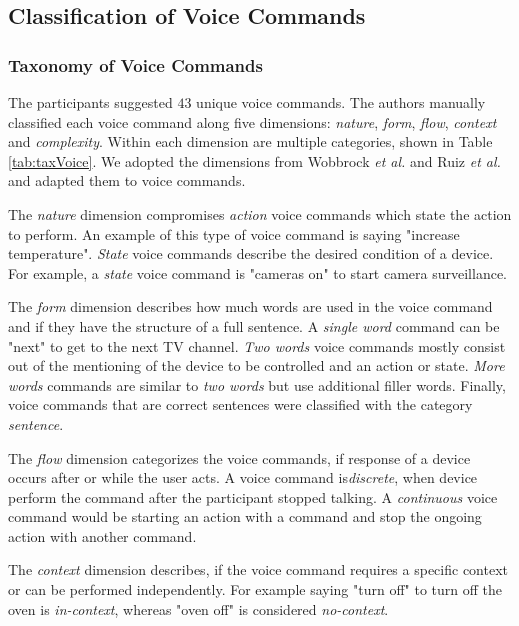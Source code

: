 \documentclass[sigchi]{acmart}
\begin{document}
\subsection{Classification of Voice Commands}
\subsubsection{Taxonomy of Voice Commands}
The participants suggested $43$ unique voice commands. The authors manually classified each voice command along five dimensions: \textit{nature}, \textit{form}, \textit{flow}, \textit{context} and \textit{complexity}. Within each dimension are multiple categories, shown in Table \ref{tab:taxVoice}. We adopted the dimensions from Wobbrock \textit{et al.} \citep{Wobbrock.2009} and Ruiz \textit{et al.} \citep{Ruiz.2011} and adapted them to voice commands. 

The \textit{nature} dimension compromises \textit{action} voice commands which state the action to perform. An example of this type of voice command is saying "increase temperature". \textit{State} voice commands describe the desired condition of a device. For example, a \textit{state} voice command is "cameras on" to start camera surveillance.

The \textit{form} dimension describes how much words are used in the voice command and if they have the structure of a full sentence. A \textit{single word} command can be "next" to get to the next TV channel. \textit{Two words} voice commands mostly consist out of the mentioning of the device to be controlled and an action or state. \textit{More words} commands are similar to \textit{two words} but use additional filler words. Finally, voice commands that are correct sentences were classified with the category \textit{sentence}.

The \textit{flow} dimension categorizes the voice commands, if response of a device occurs after or while the user acts. A voice command is\textit{discrete}, when device perform the command after the participant stopped talking. A \textit{continuous} voice command would be starting an action with a command and stop the ongoing action with another command.

The \textit{context} dimension describes, if the voice command requires a specific context or can be performed independently. For example saying "turn off" to turn off the oven is \textit{in-context}, whereas "oven off" is considered \textit{no-context}.
\end{document}
